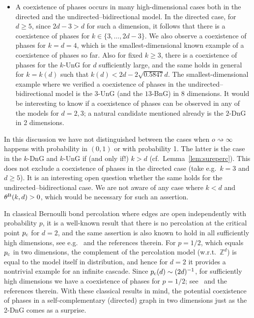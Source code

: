 \documentclass[oneside]{amsart}
\theoremstyle{definition}
\newcommand{\1}{\mathbbm{1}}
\newcommand{\0}{\mathbf{o}}
\newcommand{\Z}{\mathbb{Z}}
\newcommand{\basc}[1]{{\color{blue}{ \bf [~Bas:\ }\emph{#1}\textbf{~]}}}
\numberwithin{equation}{section}
\begin{document}
\begin{itemize}
    \item A coexistence of phases occurs in many high-dimensional cases both in the directed and the undirected--bidirectional model. In the directed case, for $d \geq 5$, since $2d-3 > d$ for such a dimension, it follows that there is a coexistence of phases for $k \in \{3, \ldots, 2d-3 \}$.  We also observe a coexistence of phases for $k=d=4$, which is the smallest-dimensional known example of a coexistence of phases so far.  Also for fixed $k \geq 3$, there is a coexistence of phases for the $k$-UnG for $d$ sufficiently large, and the same holds in general for $k=k(d)$ such that $k(d) < 2d-2 \sqrt{0.5847}d$. The smallest-dimensional example where we verified a coexistence of phases in the undirected--bidirectional model is the $3$-UnG (and the $13$-BnG) in 8 dimensions. %
    It would be interesting to know if a coexistence of phases can be observed in any of the models for $d=2,3$; a natural candidate mentioned already is the $2$-DnG in 2 dimensions.
\end{itemize}
In this discussion we have not distinguished between the cases when $o \rightsquigarrow \infty$ happens with probability in $(0,1)$ or with probability 1. The latter is the case in the $k$-DnG and $k$-UnG if (and only if!) $k>d$ (cf.\ Lemma~\ref{lem:sureperc}). This does not exclude a coexistence of phases in the directed case (take e.g.\ $k=3$ and $d \geq 5$). It is an interesting open question whether the same holds for the undirected--bidirectional case. We are not aware of any case where $k<d$ and $\theta^{\rm B}(k,d)>0$, which would be necessary for such an assertion.

In classical Bernoulli bond percolation where edges are open independently with probability $p$, it is a well-known result that there is no percolation at the critical point $p_{\rm c}$ for $d=2$, and the same assertion is also known to hold in all sufficiently high dimensions, see e.g.\ \cite{CST} and the references therein. For $p=1/2$, which equals $p_{\rm c}$ in two dimensions, the complement of the percolation model (w.r.t.\ $\Z^d$) is equal to the model itself in distribution, and hence for $d=2$ it provides a nontrivial example for an infinite cascade. Since $p_{\rm c}(d) \sim (2d)^{-1}$, for sufficiently high dimensions we have a coexistence of phases for $p=1/2$; see~\cite{Grimmett1999} and the references therein. With these classical results in mind, the potential coexistence of phases in a self-complementary (directed) graph in two dimensions just as the 2-DnG comes as a surprise. \color{black}
\end{document}
